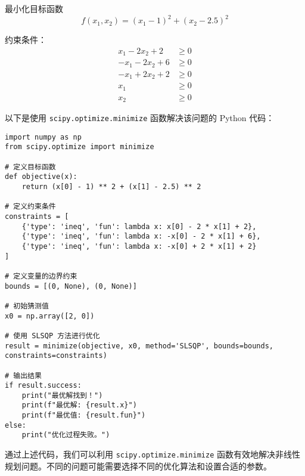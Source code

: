 \documentclass{article}
\begin{document}
最小化目标函数
\[
f(x_1, x_2) = (x_1 - 1)^2 + (x_2 - 2.5)^2
\]

约束条件：
\begin{align*}
x_1 - 2x_2 + 2 &\geq 0 \\
-x_1 - 2x_2 + 6 &\geq 0 \\
-x_1 + 2x_2 + 2 &\geq 0 \\
x_1 &\geq 0 \\
x_2 &\geq 0
\end{align*}

以下是使用 \texttt{scipy.optimize.minimize} 函数解决该问题的 Python 代码：
\begin{lstlisting}[style=pythonstyle]
import numpy as np
from scipy.optimize import minimize

# 定义目标函数
def objective(x):
    return (x[0] - 1) ** 2 + (x[1] - 2.5) ** 2

# 定义约束条件
constraints = [
    {'type': 'ineq', 'fun': lambda x: x[0] - 2 * x[1] + 2},
    {'type': 'ineq', 'fun': lambda x: -x[0] - 2 * x[1] + 6},
    {'type': 'ineq', 'fun': lambda x: -x[0] + 2 * x[1] + 2}
]

# 定义变量的边界约束
bounds = [(0, None), (0, None)]

# 初始猜测值
x0 = np.array([2, 0])

# 使用 SLSQP 方法进行优化
result = minimize(objective, x0, method='SLSQP', bounds=bounds, constraints=constraints)

# 输出结果
if result.success:
    print("最优解找到！")
    print(f"最优解: {result.x}")
    print(f"最优值: {result.fun}")
else:
    print("优化过程失败。")
\end{lstlisting}

通过上述代码，我们可以利用 \texttt{scipy.optimize.minimize} 函数有效地解决非线性规划问题。不同的问题可能需要选择不同的优化算法和设置合适的参数。
\end{document}

